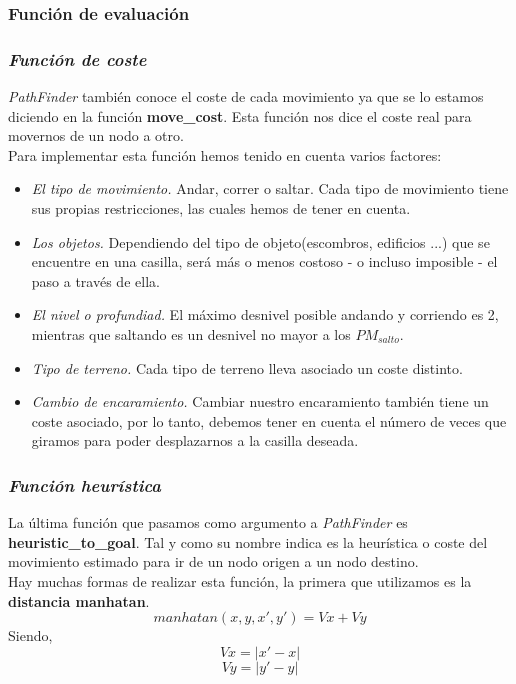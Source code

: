\documentclass[a4paper,12pt,oneside]{book}
\begin{document}
\subsubsection{Función de evaluación}

\subsubsection{{\it \bf Función de coste}}

{\it PathFinder} también conoce el coste de cada movimiento ya que se
lo estamos diciendo en la función {\bf move\_cost}. Esta función nos
dice el coste real para movernos de un nodo a otro. \\

Para implementar esta función hemos tenido en cuenta varios factores:
\begin{itemize}
\item {\it El tipo de movimiento.} Andar, correr o saltar. Cada tipo de
  movimiento tiene sus propias restricciones, las cuales hemos de tener en
  cuenta.
\item {\it Los objetos.} Dependiendo del tipo de objeto(escombros, edificios ...) que se encuentre en una
  casilla, será más o menos costoso - o incluso imposible - el paso a través de
  ella.
\item {\it El nivel o profundiad.} El máximo   desnivel posible andando y
  corriendo es 2, mientras que saltando es un desnivel no mayor a los
  $PM_{salto}$.
\item {\it Tipo de terreno.} Cada tipo de terreno lleva asociado un coste distinto.
\item {\it Cambio de encaramiento.} Cambiar nuestro encaramiento también tiene
  un coste asociado, por lo tanto, debemos tener en cuenta el número de veces
  que giramos para poder desplazarnos a la casilla deseada.
\end{itemize}


\subsubsection{{\it \bf Función heurística}}

La última función que pasamos como argumento a {\it PathFinder} es
{\bf heuristic\_to\_goal}. Tal y como su nombre indica es la
heurística o coste del movimiento estimado para ir de un nodo origen a
un nodo destino.\\

Hay muchas formas de realizar esta función, la primera que utilizamos
es la {\bf distancia manhatan}.
$$ manhatan(x,y, x',y') = Vx + Vy $$
Siendo,
$$Vx = |x'-x| $$
$$Vy = |y'-y| $$
\end{document}
